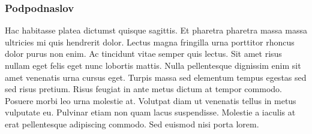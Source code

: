 \subsubsection{Podpodnaslov}
Hac habitasse platea dictumst quisque sagittis. Et pharetra pharetra massa massa ultricies mi quis hendrerit dolor. Lectus magna fringilla urna porttitor rhoncus dolor purus non enim. Ac tincidunt vitae semper quis lectus. Sit amet risus nullam eget felis eget nunc lobortis mattis. Nulla pellentesque dignissim enim sit amet venenatis urna cursus eget. Turpis massa sed elementum tempus egestas sed sed risus pretium. Risus feugiat in ante metus dictum at tempor commodo. Posuere morbi leo urna molestie at. Volutpat diam ut venenatis tellus in metus vulputate eu. Pulvinar etiam non quam lacus suspendisse. Molestie a iaculis at erat pellentesque adipiscing commodo. Sed euismod nisi porta lorem.
